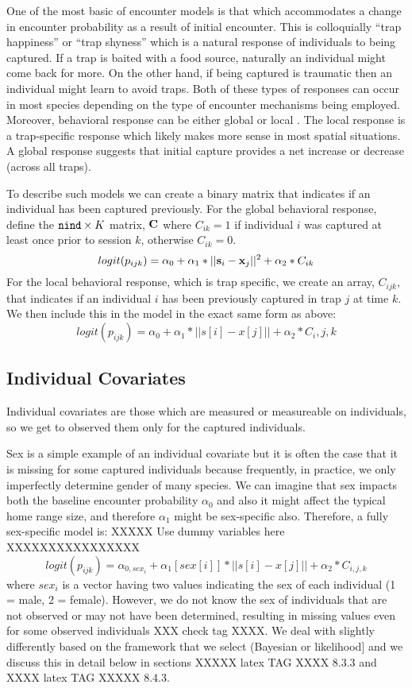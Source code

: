 One of the most basic of encounter models is that which accommodates a
change in encounter probability as a result of initial encounter.
This is colloquially ``trap happiness'' or ``trap shyness'' which is a
natural response of individuals to being captured. If a trap is baited
with a food source, naturally an individual might come back for
more. On the other hand, if being captured is traumatic then an
individual might learn to avoid traps. Both of these types of
responses can occur in most species depending on the type of encounter
mechanisms being employed. Moreover, behavioral response can be either
global \citep{gardner_etal:2010} or local \citep{royle_etal:2009jwm}.
The local response is a trap-specific response which likely makes more
sense in most spatial situations. A global response suggests that
initial capture provides a net increase or decrease (across all
traps).

To describe such models we can create a binary matrix that indicates
if an individual has been captured previously.  For the global
behavioral response, define the $\mbox{\tt nind} \times K$ matrix,
${\bf C}$ where $C_{ik} =1$
if individual $i$ was captured at least once prior to session
$k$, otherwise $C_{ik} = 0$.
\[
logit(p_{ijk}) = \alpha_{0} + \alpha_1 *||{\bf s}_{i}-{\bf x}_{j}||^{2} + \alpha_2*C_{ik}
\]
For the local behavioral response, which is trap specific, we create
an array, $C_{ijk}$, that indicates if an individual $i$ has been
previously captured in trap $j$ at time $k$.  We then include this in
the model in the exact same form as above:
\[
logit(p_{ijk}) = \alpha_{0} + \alpha_1*||s[i]-x[j]|| + \alpha_2*C_i,j,k	
\]


\subsection{Individual Covariates}

Individual covariates are those which are measured or measureable on
individuals, so we get to observed them only for the captured
individuals. 

Sex is a simple example of an individual covariate but it is often the
case that it is missing for some captured individuals because 
frequently, in practice, we only imperfectly determine gender of many
species. We can imagine that sex impacts both the baseline encounter
probability $\alpha_{0}$ and also it might affect the typical home range
size, and therefore  $\alpha_{1}$ might be sex-specific
also. Therefore, a fully sex-specific model is:
XXXXX Use dummy variables here XXXXXXXXXXXXXXXX
\[
logit(p_{ijk}) = \alpha_{0,sex_{i}} + \alpha_1[sex[i]]*||s[i]-x[j]|| + \alpha_2*C_{i,j,k}
\]
where $sex_{i}$ is a vector  having two values indicating the sex of
each individual (1 = male, 2 = female).  However, we do not know the
sex of individuals that are not observed or may not have been
determined, resulting in missing values even for some observed
individuals \citep{gardner_etal:2010jwm} XXX check tag XXXX. 
We deal with slightly differently based on the framework
that we select (Bayesian or likelihood] and we discuss this in detail
below in sections XXXXX latex TAG XXXX 8.3.3 and XXXX latex TAG XXXXX 8.4.3.


